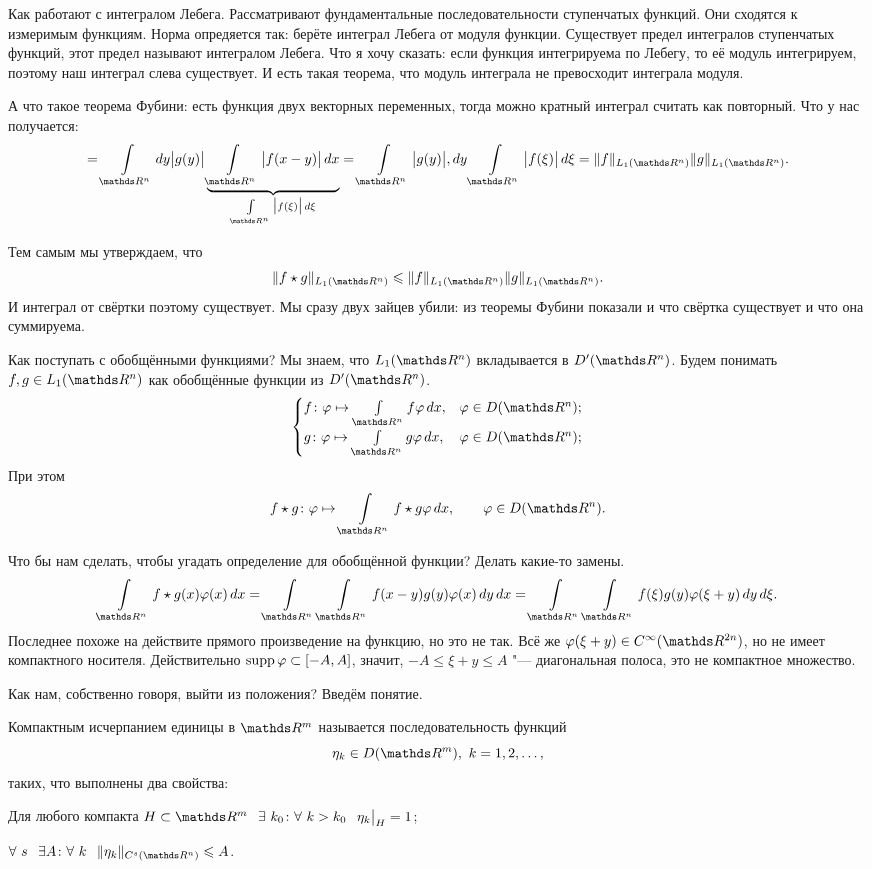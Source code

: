 Как работают с интегралом Лебега. Рассматривают фундаментальные последовательности ступенчатых функций. Они сходятся к измеримым функциям. Норма опредяется так: берёте интеграл Лебега от модуля функции. Существует предел интегралов ступенчатых функций, этот предел называют интегралом Лебега. Что я хочу сказать: если функция интегрируема по Лебегу, то её модуль интегрируем, поэтому наш интеграл слева существует. И есть такая теорема, что модуль интеграла не превосходит интеграла модуля.

А что такое теорема Фубини: есть функция двух векторных переменных, тогда можно кратный интеграл считать как повторный. Что у нас получается:
\[
  = \Gint{\R^n}dy\big|g(y)\big|\underbrace{\Gint{\R^n}\big|f(x-y)\big|\,dx}_{\Gint{\R^n} \big|f(\xi)\big|\,d\xi }= \Gint{\R^n}\big|g(y)\big|,dy  \Gint{\R^n}\big|f(\xi)\big|\,d\xi = \|f\|_{L_1(\R^n)}\|g\|_{L_1(\R^n)}.
\]

Тем самым мы утверждаем, что
\[\|f\star g\|_{L_1(\R^n)}\le \|f\|_{L_1(\R^n)} \|g\|_{L_1(\R^n)}.\]
И интеграл от свёртки поэтому существует. Мы сразу двух зайцев убили: из теоремы Фубини показали и что свёртка существует и что она суммируема.

Как поступать с обобщёнными функциями? Мы знаем, что $L_1(\R^n)$ вкладывается в $D'(\R^n)$. Будем понимать $f,g\in L_1(\R^n)$ как обобщённые функции из $D'(\R^n)$.
\[\begin{cases}f\colon \phi\mapsto \Gint{\R^n} f\phi\,dx,& \phi\in D(\R^n);\\
  g\colon \phi\mapsto \Gint{\R^n} g\phi\,dx,& \phi\in D(\R^n);\end{cases}\]
При этом
\[f\star g\colon \phi\mapsto \Gint{\R^n} f\star g \phi\,dx,\qquad \phi\in D(\R^n).\]

Что бы нам сделать, чтобы угадать определение для обобщённой функции? Делать какие-то замены.
\[\Gint{\R^n} f\star g(x)\phi(x)\,dx = \Gint{\R^n}\Gint{\R^n} f(x-y)g(y)\phi(x)\,dy\,dx = \Gint{\R^n}\Gint{\R^n} f(\xi)g(y)\phi(\xi+y)\,dy\,d\xi.\]
Последнее похоже на действите прямого произведение на функцию, но это не так. Всё же $\phi(\xi+y)\in C^\infty(\R^{2n})$, но не имеет компактного носителя. Действительно $\operatorname{supp} \varphi\subset [-A,A]$, значит, $-A\le \xi+y\le A$ "--- диагональная полоса, это не компактное множество.

Как нам, собственно говоря, выйти из положения? Введём понятие.
\begin{Def}
  Компактным исчерпанием единицы в $\R^m$ называется последовательность функций 
\[\eta_k\in D(\R^m),\ k=1,2,\dots,\]
таких, что выполнены два свойства:
\begin{roItems}
  \item Для любого компакта $H\subset \R^m\pau \exists\ k_0\colon \forall\ k>k_0\pau \eta_k\big|_H=1$;
  \item $\forall\ s\pau \exists A\colon \forall\ k\pau \|\eta_k\|_{C^s(\R^n)}\le A$.
\end{roItems}
\end{Def}

